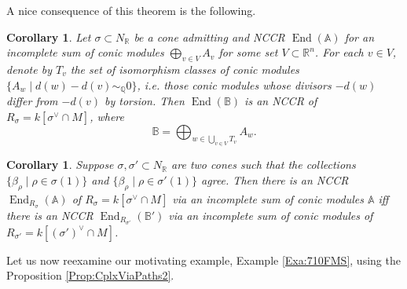 \documentclass[reqno, 12pt]{amsart}
\newtheorem{corollary}[theorem]{Corollary}
\theoremstyle{definition}
\numberwithin{equation}{section}
\newcommand{\R}{\mathbb{R}}
\newcommand{\Q}{\mathbb{Q}}
\newcommand{\End}{\operatorname{End}}
\begin{document}
A nice consequence of this theorem is the following.
\begin{corollary}
    \label{Cor:IfNCCRIncludeTorsion}
    Let $\sigma\subset N_\R$ be a cone admitting and NCCR $\End(\mathbb{A})$ for an incomplete sum of conic modules $\bigoplus_{v\in V}A_v$ for some set $V\subset \R^n$. For each $v\in V$, denote by $T_v$ the set of isomorphism classes of conic modules $\{A_w\mid d(w)-d(v)\sim_{\Q}0\}$, i.e. those conic modules whose divisors $-d(w)$ differ from $-d(v)$ by torsion. Then $\End(\mathbb{B})$ is an NCCR of $R_\sigma=k[\sigma^\vee\cap M]$, where \[\mathbb{B}=\bigoplus_{w\in \bigcup_{v\in V}T_v}A_w.\]
\end{corollary}

\begin{corollary}
\label{Cor:2ndFanDetermines}
Suppose $\sigma, \sigma'\subset N_\R$ are two cones such that the collections $\{\beta_\rho\mid \rho\in \sigma(1)\}$ and $\{\beta_\rho\mid \rho\in \sigma'(1)\}$ agree. Then there is an NCCR  $\End_{R_\sigma}(\mathbb{A})$ of $R_\sigma=k[\sigma^\vee\cap M]$ via an incomplete sum of conic modules $\mathbb{A}$ iff there is an NCCR $\End_{R_{\sigma'}}(\mathbb{B}')$ via an incomplete sum of conic modules of $R_{\sigma'}=k[(\sigma')^\vee\cap M]$.
\end{corollary}

Let us now reexamine our motivating example, Example \ref{Exa:710FMS}, using the Proposition \ref{Prop:CplxViaPaths2}.
\end{document}
